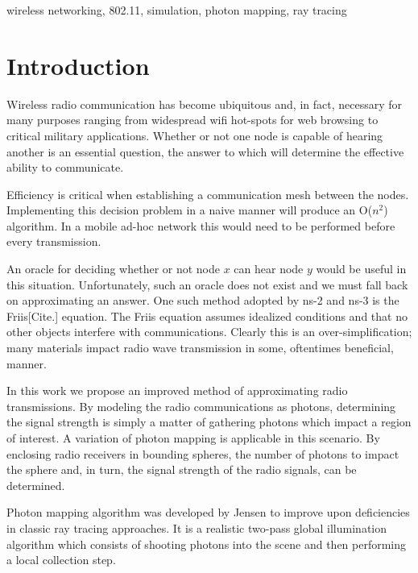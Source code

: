 \documentclass[%
        final,
        notitlepage,
        narroweqnarray,
        inline,
        twoside,
        ]{ieee}
\begin{document}
\vspace{5mm}
\begin{keywords}
wireless networking, 802.11, simulation, photon mapping, ray tracing
\end{keywords}

\section{Introduction}

Wireless radio communication has become ubiquitous and, in fact, necessary for 
many purposes ranging from widespread wifi hot-spots for web browsing to 
critical military applications.  Whether or not one node is capable of 
hearing another is an essential question, the answer to which will 
determine the effective ability to communicate.

Efficiency is critical when establishing a communication mesh between the
nodes. Implementing this decision problem
in a naive manner will produce an O($n^2$) algorithm.  In a mobile ad-hoc
network this would need to be performed before every transmission.

An oracle for deciding whether or not node $x$ can hear node $y$ would be useful 
in this situation.  Unfortunately, such an oracle does not exist and we must 
fall back on approximating an answer.  One such method adopted by ns-2 and 
ns-3 is the Friis[Cite.] equation.  The Friis equation assumes idealized 
conditions and that no other objects interfere with communications.  Clearly 
this is an over-simplification; many materials impact radio wave transmission 
in some, oftentimes beneficial, manner.

In this work we propose an improved method of approximating radio 
transmissions.  By modeling the radio communications as photons, determining 
the signal strength is simply a matter of gathering photons which impact a 
region of interest.  A variation of photon mapping is applicable in this
scenario.  By enclosing radio receivers in bounding spheres, the number of
photons to impact the sphere and, in turn, the signal strength of the radio
signals, can be determined.

Photon mapping algorithm was developed by Jensen \cite{Jensen96globalillumination} 
to improve upon deficiencies in classic ray tracing approaches.  It is a
realistic two-pass global illumination algorithm which consists of shooting
photons into the scene and then performing a local collection step.
\end{document}
